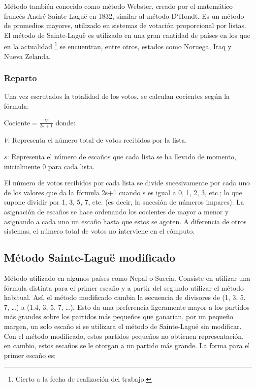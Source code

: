 \documentclass[12pt,a4paper,]{book}
\let\rmarkdownfootnote\footnote%
\def\footnote{\protect\rmarkdownfootnote}
\numberwithin{dummy}{section}
\theoremstyle{ocrenumbox}
\theoremstyle{blacknumex}
\theoremstyle{blacknumbox}
\theoremstyle{ocrenum}
\theoremstyle{ocrenum}
\begin{document}
Método también conocido como método Webster, creado por el matemático
francés André Sainte-Laguë en 1832, similar al método D`Hondt. Es un
método de promedios mayores, utilizado en sistemas de votación
proporcional por listas.\\
El método de Sainte-Laguë es utilizado en una gran cantidad de países en
los que en la actualidad \footnote{Cierto a la fecha de realización del
  trabajo.} se encuentran, entre otros, estados como Noruega, Iraq y
Nueva Zelanda.

\hypertarget{reparto-1}{%
\subsubsection{Reparto}\label{reparto-1}}

Una vez escrutados la totalidad de los votos, se calculan cocientes
según la fórmula:

\(\textrm{Cociente} = \frac{V}{2s+1}\) donde:

\(V\): Representa el número total de votos recibidos por la lista.

\(s\): Representa el número de escaños que cada lista se ha llevado de
momento, inicialmente 0 para cada lista.

El número de votos recibidos por cada lista se divide sucesivamente por
cada uno de los valores que da la fórmula 2s+1 cuando s es igual a 0, 1,
2, 3, etc.; lo que supone dividir por 1, 3, 5, 7, etc. (es decir, la
sucesión de números impares). La asignación de escaños se hace ordenando
los cocientes de mayor a menor y asignando a cada uno un escaño hasta
que estos se agoten. A diferencia de otros sistemas, el número total de
votos no interviene en el cómputo.

\hypertarget{muxe9todo-sainte-laguuxeb-modificado}{%
\subsection{Método Sainte-Laguë
modificado}\label{muxe9todo-sainte-laguuxeb-modificado}}

Método utilizado en algunos países como Nepal o Suecia. Consiste en
utilizar una fórmula distinta para el primer escaño y a partir del
segundo utilizar el método habitual. Así, el método modificado cambia la
secuencia de divisores de (1, 3, 5, 7, \ldots) a (1.4, 3, 5, 7, \ldots).
Esto da una preferencia ligeramente mayor a los partidos más grandes
sobre los partidos más pequeños que ganarían, por un pequeño margen, un
solo escaño si se utilizara el método de Sainte-Laguë sin modificar. Con
el método modificado, estos partidos pequeños no obtienen
representación, en cambio, estos escaños se le otorgan a un partido más
grande. La forma para el primer escaño es:
\end{document}
